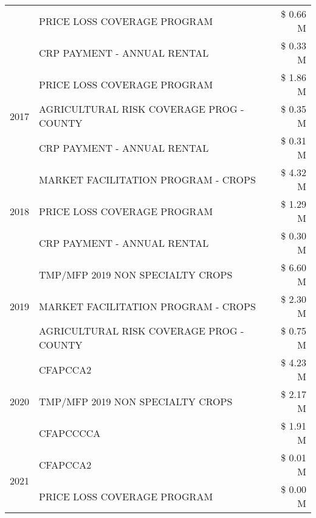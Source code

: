 \begin{tabular}{llr}
 & PRICE LOSS COVERAGE PROGRAM & \$ 0.66 M \\
 & CRP PAYMENT - ANNUAL RENTAL & \$ 0.33 M \\
\cline{1-3}
\multirow[t]{3}{*}{2017} & PRICE LOSS COVERAGE PROGRAM & \$ 1.86 M \\
 & AGRICULTURAL RISK COVERAGE PROG - COUNTY & \$ 0.35 M \\
 & CRP PAYMENT - ANNUAL RENTAL & \$ 0.31 M \\
\cline{1-3}
\multirow[t]{3}{*}{2018} & MARKET FACILITATION PROGRAM - CROPS & \$ 4.32 M \\
 & PRICE LOSS COVERAGE PROGRAM & \$ 1.29 M \\
 & CRP PAYMENT - ANNUAL RENTAL & \$ 0.30 M \\
\cline{1-3}
\multirow[t]{3}{*}{2019} & TMP/MFP 2019 NON SPECIALTY CROPS & \$ 6.60 M \\
 & MARKET FACILITATION PROGRAM - CROPS & \$ 2.30 M \\
 & AGRICULTURAL RISK COVERAGE PROG - COUNTY & \$ 0.75 M \\
\cline{1-3}
\multirow[t]{3}{*}{2020} & CFAPCCA2 & \$ 4.23 M \\
 & TMP/MFP 2019 NON SPECIALTY CROPS & \$ 2.17 M \\
 & CFAPCCCCA & \$ 1.91 M \\
\cline{1-3}
\multirow[t]{2}{*}{2021} & CFAPCCA2 & \$ 0.01 M \\
 & PRICE LOSS COVERAGE PROGRAM & \$ 0.00 M \\
\cline{1-3}
\bottomrule
\end{tabular}

